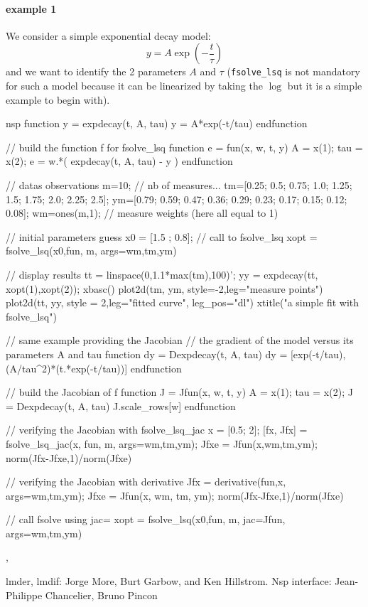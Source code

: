 \begin{examples}
\paragraph{example 1} 
We consider a simple exponential decay model:
$$
 y = A \exp(-\frac{t}{\tau})
$$
and we want to identify the 2 parameters $A$ and $\tau$ (\verb+fsolve_lsq+ is not
mandatory for such a model because it can be linearized by taking the $\log$ but
it is a simple example to begin with). 

\begin{mintednsp}{nsp}
function y = expdecay(t, A, tau)
   y = A*exp(-t/tau) 
endfunction

// build the function f for fsolve_lsq
function e = fun(x, w, t, y)
   A = x(1); tau = x(2);
   e = w.*( expdecay(t, A, tau) - y )
endfunction

// datas observations
m=10;    // nb of measures...
tm=[0.25; 0.5; 0.75; 1.0; 1.25; 1.5; 1.75; 2.0; 2.25; 2.5];
ym=[0.79; 0.59; 0.47; 0.36; 0.29; 0.23; 0.17; 0.15; 0.12; 0.08];
wm=ones(m,1); // measure weights (here all equal to 1)

// initial parameters guess
x0 = [1.5 ; 0.8];
// call to fsolve_lsq
xopt = fsolve_lsq(x0,fun, m, args={wm,tm,ym})

// display results
tt = linspace(0,1.1*max(tm),100)';
yy = expdecay(tt, xopt(1),xopt(2));
xbasc()
plot2d(tm, ym, style=-2,leg="measure points")
plot2d(tt, yy, style = 2,leg="fitted curve", leg_pos="dl")
xtitle("a simple fit with fsolve_lsq")

// same example providing the Jacobian
// the gradient of the model versus its parameters A and tau
function dy = Dexpdecay(t, A, tau)
   dy = [exp(-t/tau), (A/tau^2)*(t.*exp(-t/tau))]
endfunction

// build the Jacobian of f
function J = Jfun(x, w, t, y)
   A = x(1); tau = x(2);
   J = Dexpdecay(t, A, tau)
   J.scale_rows[w]
endfunction

// verifying the Jacobian with fsolve_lsq_jac
x = [0.5; 2]; 
[fx, Jfx] = fsolve_lsq_jac(x, fun, m, args={wm,tm,ym});
Jfxe =  Jfun(x,wm,tm,ym);
norm(Jfx-Jfxe,1)/norm(Jfxe)

// verifying the Jacobian with derivative
Jfx = derivative(fun,x, args={wm,tm,ym});
Jfxe =  Jfun(x, wm, tm, ym);
norm(Jfx-Jfxe,1)/norm(Jfxe)

// call fsolve using jac=
xopt = fsolve_lsq(x0,fun, m, jac=Jfun, args={wm,tm,ym})
\end{mintednsp}

\end{examples}

\begin{manseealso}
  , 
\end{manseealso}

\begin{authors}
 lmder, lmdif: Jorge More, Burt Garbow, and Ken Hillstrom. Nsp interface: Jean-Philippe Chancelier, Bruno Pincon
\end{authors}
